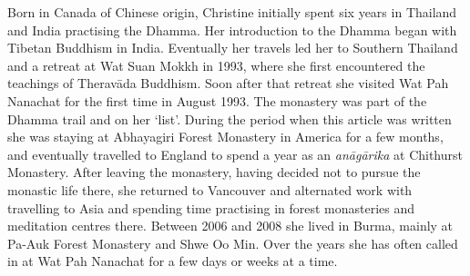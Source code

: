Born in Canada of Chinese origin, Christine initially spent six
years in Thailand and India practising the Dhamma. Her introduction to
the Dhamma began with Tibetan Buddhism in India. Eventually her travels
led her to Southern Thailand and a retreat at Wat Suan Mokkh in 1993, 
where she first encountered the teachings of Theravāda Buddhism. Soon
after that retreat she visited Wat Pah Nanachat for the first time in
August 1993. The monastery was part of the Dhamma trail and on her
`list'. During the period when this article was written she was staying
at Abhayagiri Forest Monastery in America for a few months, and
eventually travelled to England to spend a year as an \emph{anāgārika} at
Chithurst Monastery. After leaving the monastery, having decided not to
pursue the monastic life there, she returned to Vancouver and alternated
work with travelling to Asia and spending time practising in forest
monasteries and meditation centres there. Between 2006 and 2008 she
lived in Burma, mainly at Pa-Auk Forest Monastery and Shwe Oo Min. Over
the years she has often called in at Wat Pah Nanachat for a few days or
weeks at a time.

